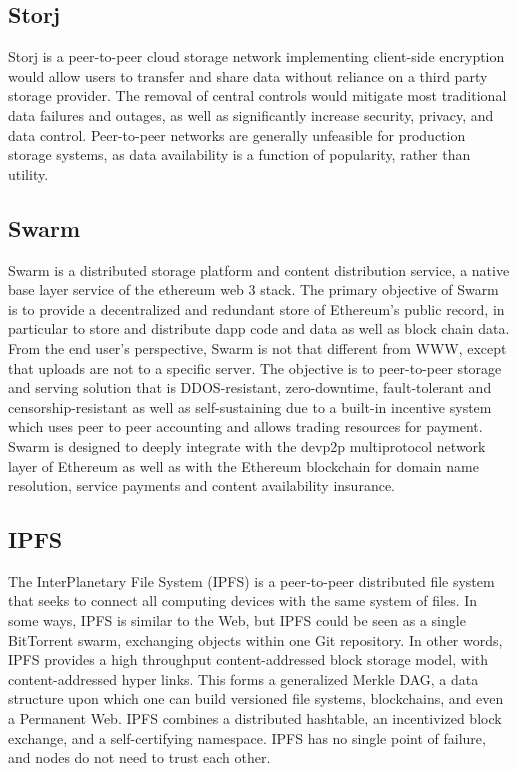 \subsection*{Storj}
Storj is a peer-to-peer cloud storage network implementing client-side encryption would allow users to transfer and share data without reliance on a third party storage provider. The removal of central controls would mitigate most traditional data failures and outages, as well as significantly increase security, privacy, and data control. Peer-to-peer networks are generally unfeasible for production storage systems, as data availability is a function of popularity, rather than utility.

\subsection*{Swarm}
Swarm is a distributed storage platform and content distribution service, a native base layer service of the ethereum web 3 stack. The primary objective of Swarm is to provide a decentralized and redundant store of Ethereum's public record, in particular to store and distribute dapp code and data as well as block chain data.
From the end user's perspective, Swarm is not that different from WWW, except that uploads are not to a specific server. The objective is to peer-to-peer storage and serving solution that is DDOS-resistant, zero-downtime, fault-tolerant and censorship-resistant as well as self-sustaining due to a built-in incentive system which uses peer to peer accounting and allows trading resources for payment. Swarm is designed to deeply integrate with the devp2p multiprotocol network layer of Ethereum as well as with the Ethereum blockchain for domain name resolution, service payments and content availability insurance.

\subsection*{IPFS}
The InterPlanetary File System (IPFS) is a peer-to-peer distributed file system that seeks to connect all computing devices with the same system of files. In some ways, IPFS is similar to the Web, but IPFS could be seen as a single BitTorrent swarm, exchanging objects within one Git repository. In other words, IPFS provides a high throughput content-addressed block storage model, with content-addressed hyper links. This forms a generalized Merkle DAG, a data structure upon which one can build versioned file systems, blockchains, and even a Permanent Web. IPFS combines a distributed hashtable, an incentivized block exchange, and a self-certifying namespace. IPFS has no single point of failure, and nodes do not need to trust each other.

